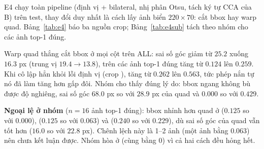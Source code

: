 E4 chạy toàn pipeline (định vị  + bilateral, nhị phân Otsu, tách ký tự CCA của B) trên test, thay đổi duy nhất là cách lấy ảnh biển $220\times 70$: cắt bbox hay warp quad. Bảng~\ref{tab:e4} báo ba nguồn crop; Bảng~\ref{tab:e4sub} tách theo nhóm cho các ảnh top-1 đúng.

\begin{table}[htbp]
\centering
\caption{E4: cắt bbox so với warp quad, tập test, dòng ALL. Sai số góc tính theo pixel ảnh gốc trên 347 ảnh top-1 đúng. Nguồn: .}
\label{tab:e4}
\small
\resizebox{\textwidth}{!}{}
\end{table}

\begin{table}[htbp]
\centering
\caption{E4 theo nhóm, chỉ ảnh top-1 đúng (), tập test. : sai số góc trung bình (px); : ; : . Nguồn: .}
\label{tab:e4sub}
\small
\resizebox{\textwidth}{!}{}
\end{table}

Warp quad thắng cắt bbox ở mọi cột trên ALL: sai số góc giảm từ $25.2$ xuống $16.3$ px (trung vị $19.4\to 13.8$),  trên các ảnh top-1 đúng tăng từ $0.124$ lên $0.259$. Khi cô lập hẳn khỏi lỗi định vị (crop ),  tăng từ $0.262$ lên $0.563$, tức phép nắn tự nó đã làm  tăng hơn gấp đôi. Nhóm  cho thấy đúng lý do: bbox ngang không bù được độ nghiêng, sai số góc $68.0$ px so với $28.9$ px của quad và  $0.000$ so với $0.429$.

\textbf{Ngoại lệ ở nhóm } ($n=16$ ảnh top-1 đúng): bbox nhỉnh hơn quad ở  ($0.125$ so với $0.000$),  ($0.125$ so với $0.063$) và  ($0.240$ so với $0.229$), dù sai số góc của quad vẫn tốt hơn ($16.0$ so với $22.8$ px). Chênh lệch này là 1--2 ảnh (một ảnh bằng $0.063$) nên chưa kết luận được. Nhóm  hòa ở  (cùng bằng 0) vì cả hai cách đều hỏng hết.

